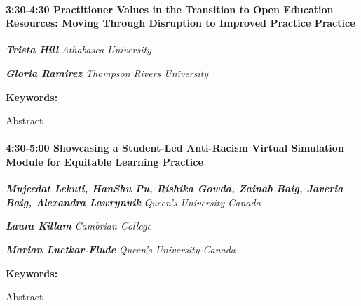 \documentclass[
]{book}
\begin{document}
\begin{session}
\hypertarget{practitioner-values-in-the-transition-to-open-education-resources-moving-through-disruption-to-improved-practice-practice}{%
\paragraph*{\texorpdfstring{3:30-4:30 \textbar{} \textbf{Practitioner
Values in the Transition to Open Education Resources: Moving Through
Disruption to Improved Practice} \textbar{}
Practice}{3:30-4:30 \textbar{} Practitioner Values in the Transition to Open Education Resources: Moving Through Disruption to Improved Practice \textbar{} Practice}}\label{practitioner-values-in-the-transition-to-open-education-resources-moving-through-disruption-to-improved-practice-practice}}

\textbf{\emph{Trista Hill}} \textbar{} \emph{Athabasca University}

\textbf{\emph{Gloria Ramirez}} \textbar{} \emph{Thompson Rivers
University}

\textbf{Keywords:}

Abstract
\end{session}
\begin{session}
\hypertarget{showcasing-a-student-led-anti-racism-virtual-simulation-module-for-equitable-learning-practice}{%
\paragraph*{\texorpdfstring{4:30-5:00 \textbar{} \textbf{Showcasing a
Student-Led Anti-Racism Virtual Simulation Module for Equitable
Learning} \textbar{}
Practice}{4:30-5:00 \textbar{} Showcasing a Student-Led Anti-Racism Virtual Simulation Module for Equitable Learning \textbar{} Practice}}\label{showcasing-a-student-led-anti-racism-virtual-simulation-module-for-equitable-learning-practice}}

\textbf{\emph{Mujeedat Lekuti, HanShu Pu, Rishika Gowda, Zainab Baig,
Javeria Baig, Alexandra Lawrynuik}} \textbar{} \emph{Queen's University
Canada}

\textbf{\emph{Laura Killam}} \textbar{} \emph{Cambrian College}

\textbf{\emph{Marian Luctkar-Flude}} \textbar{} \emph{Queen's University
Canada}

\textbf{Keywords:}

Abstract
\end{session}
\end{document}
